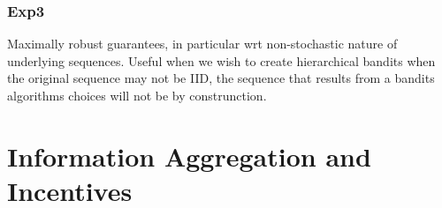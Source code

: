 




\subsubsection{Exp3}

 Maximally robust guarantees, in particular wrt non-stochastic nature of underlying sequences. Useful when we wish to create hierarchical bandits when the original sequence may not be IID, the sequence that results from a bandits algorithms choices will not be by construnction.


\section{Information Aggregation and Incentives}

